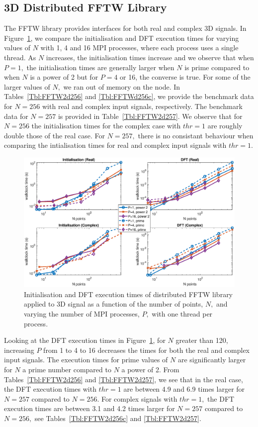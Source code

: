 \documentclass[a4paper]{article}
\begin{document}
\subsection{3D Distributed FFTW Library}\label{Sec:3DDistFFTW}
The FFTW library provides interfaces for both real and complex 3D
signals. In Figure~\ref{3DDistFFTW}, we compare the initialisation and
DFT execution times for varying values of $N$ with 1, 4 and 16 MPI
processes, where each process uses a single thread. As $N$ increases,
the initialisation times increase and we observe that when $P=1,$ the
initialisation times are generally larger when $N$ is prime compared
to when $N$ is a power of 2 but for $P=4$ or 16, the converse is
true. For some of the larger values of $N,$ we ran out of memory on
the node. In Tables~\ref{Tbl:FFTW2d256} and \ref{Tbl:FFTWd256c}, we
provide the benchmark data for $N=256$ with real and complex input
signals, respectively. The benchmark data for $N=257$ is provided in
Table~\ref{Tbl:FFTW2d257}. We observe that for $N=256$ the
initialisation times for the complex case with $thr=1$ are roughly
double those of the real case. For $N=257,$ there is no consistant
behaviour when comparing the intialisation times for real and complex
input signals with $thr=1.$



\begin{figure}[htb]
    \centering
    \includegraphics[width=0.9\linewidth]{../results/fftw_3d_mpi.eps}
  \caption{Initialisation and DFT execution times of distributed FFTW library applied to 3D signal as a function of the
    number of points, $N,$ and varying the number of MPI processes, $P,$ with one thread per process.}
  \label{3DDistFFTW}
\end{figure}

Looking at the DFT execution times in Figure~\ref{3DDistFFTW}, for $N$
greater than 120, increasing $P$ from 1 to 4 to 16 decreases the times
for both the real and complex input signals. The execution times for
prime values of $N$ are significantly larger for $N$ a prime number
compared to $N$ a power of 2. From Tables~\ref{Tbl:FFTW2d256} and
\ref{Tbl:FFTW2d257}, we see that in the real case, the DFT execution
times with $thr=1$ are between 4.9 and 6.9 times larger for $N=257$
compared to $N=256.$ For complex signals with $thr=1,$ the DFT
execution times are between 3.1 and 4.2 times larger for $N=257$
compared to $N=256,$ see Tables~\ref{Tbl:FFTW2d256c} and
\ref{Tbl:FFTW2d257}.
\end{document}
